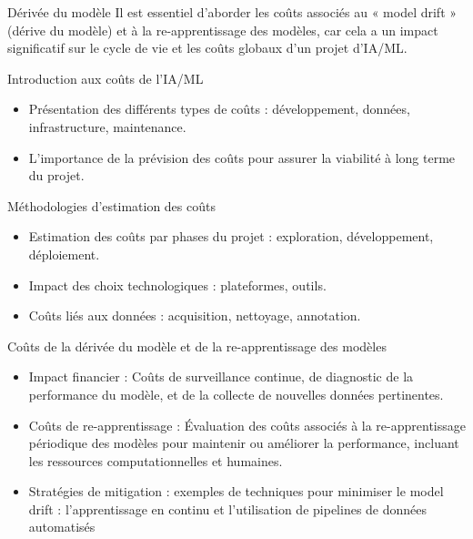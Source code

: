 \begin{frame}{Dérivée du modèle}
  Il est essentiel d'aborder les coûts associés au « model drift »
  (dérive du modèle) et à la re-apprentissage des modèles, car cela a un
  impact significatif sur le cycle de vie et les coûts globaux d'un
  projet d'IA/ML.
\end{frame}

\begin{frame}{Introduction aux coûts de l'IA/ML}
  \begin{itemize}
  \item Présentation des différents types de coûts : développement,
    données, infrastructure, maintenance.
  \item L'importance de la prévision des coûts pour assurer la
    viabilité à long terme du projet.
  \end{itemize}
\end{frame}

\begin{frame}{Méthodologies d'estimation des coûts}
  \begin{itemize}
  \item Estimation des coûts par phases du projet : exploration,
    développement, déploiement.
  \item Impact des choix technologiques : plateformes, outils.
  \item Coûts liés aux données : acquisition, nettoyage, annotation.
  \end{itemize}
\end{frame}

\begin{frame}{Coûts de la dérivée du modèle et de la re-apprentissage des modèles}
  \begin{itemize}
  \item {Impact financier :} Coûts de surveillance continue, de
    diagnostic de la performance du modèle, et de la collecte de
    nouvelles données pertinentes.
  \item {Coûts de re-apprentissage :} Évaluation des coûts associés à la
    re-apprentissage périodique des modèles pour maintenir ou améliorer la
    performance, incluant les ressources computationnelles et
    humaines.
  \item {Stratégies de mitigation :} exemples de techniques pour
    minimiser le model drift : l'apprentissage en continu et
    l'utilisation de pipelines de données automatisés
  \end{itemize}
\end{frame}

